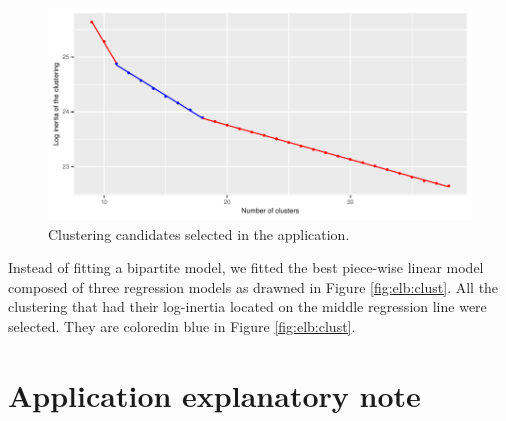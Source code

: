 \begin{appendices}
\begin{figure}[H]
  \centering
  \includegraphics[]{figs/App/NB_CLUST.pdf}
  \caption{Clustering candidates selected in the application.}
  \label{fig:elb:clust2}
\end{figure}

Instead of fitting a bipartite model, we fitted the best piece-wise linear model composed of three regression models as drawned in Figure \ref{fig:elb:clust}. All the clustering that had their log-inertia located on the middle regression line were selected. They are coloredin blue in Figure \ref{fig:elb:clust}.    

\section{Application explanatory note}\label{app:chap6:2}



\end{appendices}